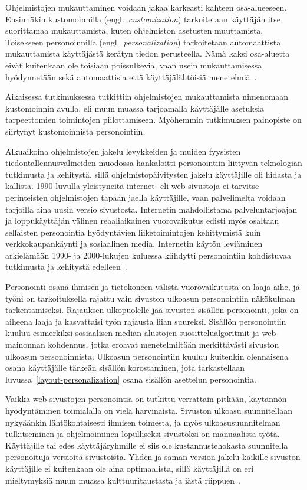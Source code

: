 \documentclass[finnish, 12pt, a4paper, elec, utf8, a-1b, online]{aaltothesis}
\begin{document}
Ohjelmistojen mukauttaminen voidaan jakaa karkeasti kahteen osa-alueeseen.
Ensinnäkin kustomoinnilla (engl.~\textit{customization}) tarkoitetaan käyttäjän
itse suorittamaa mukauttamista, kuten ohjelmiston asetusten muuttamista.
Toisekseen personoinnilla (engl.~\textit{personalization}) tarkoitetaan
automaattista mukauttamista käyttäjästä kerätyn tiedon perusteella. Nämä kaksi
osa-aluetta eivät kuitenkaan ole toisiaan poissulkevia, vaan usein
mukauttamisessa hyödynnetään sekä automaattisia että käyttäjälähtöisiä
menetelmiä~\cite{10.1145/633292.633483}.

Aikaisessa tutkimuksessa tutkittiin ohjelmistojen mukauttamista nimenomaan
kustomoinnin avulla, eli muun muassa tarjoamalla käyttäjälle asetuksia
tarpeettomien toimintojen piilottamiseen. Myöhemmin tutkimuksen painopiste on
siirtynyt kustomoinnista personointiin.

Alkuaikoina ohjelmistojen jakelu levykkeiden ja muiden fyysisten
tiedontallennusvälineiden muodossa hankaloitti personointiin liittyvän
teknologian tutkimusta ja kehitystä, sillä ohjelmistopäivitysten jakelu
käyttäjille oli hidasta ja kallista. 1990-luvulla yleistyneitä internet- eli
web-sivustoja ei tarvitse perinteisten ohjelmistojen tapaan jaella käyttäjille,
vaan palvelimelta voidaan tarjoilla aina uusin versio sivustosta. Internetin
mahdollistama palveluntarjoajan ja loppukäyttäjän välinen reaaliaikainen
vuorovaikutus edisti myös osaltaan sellaisten personointia hyödyntävien
liiketoimintojen kehittymistä kuin verkkokaupankäynti ja sosiaalinen media.
Internetin käytön leviäminen arkielämään 1990- ja 2000-lukujen kuluessa
kiihdytti personointiin kohdistuvaa tutkimusta ja kehitystä
edelleen~\cite{10.1108/03090560710737534}.

Personointi osana ihmisen ja tietokoneen välistä vuorovaikutusta on laaja aihe,
ja työni on tarkoituksella rajattu vain sivuston ulkoasun personointiin
näkökulman tarkentamiseksi. Rajauksen ulkopuolelle jää sivuston sisällön
personointi, joka on aiheena laaja ja kasvattaisi työn rajausta liian suureksi.
Sisällön personointiin kuuluu esimerkiksi sosiaalisen median alustojen
suosittelualgoritmit ja web-mainonnan kohdennus, jotka eroavat menetelmiltään
merkittävästi sivuston ulkoasun personoinnista. Ulkoasun personointiin kuuluu
kuitenkin olennaisena osana käyttäjälle tärkeän sisällön korostaminen, jota
tarkastellaan luvussa~\ref{layout-personalization} osana sisällön asettelun
personointia.

Vaikka web-sivustojen personointia on tutkittu verrattain pitkään, käytännön
hyödyntäminen toimialalla on vielä harvinaista. Sivuston ulkoasu suunnitellaan
nykyäänkin lähtökohtaisesti ihmisen toimesta, ja myös ulkoasusuunnitelman
tulkitseminen ja ohjelmoiminen lopulliseksi sivustoksi on manuaalista työtä.
Käyttäjille tai edes käyttäjäryhmille ei siis ole kustannustehokasta suunnitella
personoituja versioita sivustoista. Yhden ja saman version jakelu kaikille
sivuston käyttäjille ei kuitenkaan ole aina optimaalista, sillä käyttäjillä on
eri mieltymyksiä muun muassa kulttuuritaustasta ja iästä
riippuen~\cite{10.1145/2556288.2557052}.
\end{document}
